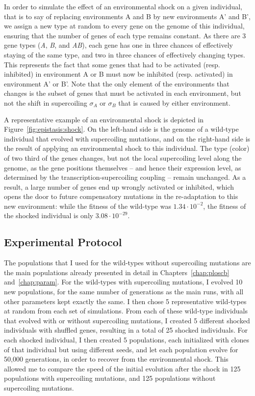 In order to simulate the effect of an environmental shock on a given individual, that is to say of replacing environments A and B by new environments A' and B', we assign a new type at random to every gene on the genome of this individual, ensuring that the number of genes of each type remains constant.
As there are 3 gene types (\emph{A}, \emph{B}, and \emph{AB}), each gene has one in three chances of effectively staying of the same type, and two in three chances of effectively changing types.
This represents the fact that some genes that had to be activated (resp. inhibited) in environment A or B must now be inhibited (resp. activated) in environment A' or B'.
Note that the only element of the environments that changes is the subset of genes that must be activated in each environment, but not the shift in supercoiling $\sigma_A$ or $\sigma_B$ that is caused by either environment.

A representative example of an environmental shock is depicted in Figure~\ref{fig:epistasis:shock}.
On the left-hand side is the genome of a wild-type individual that evolved with supercoiling mutations, and on the right-hand side is the result of applying an environmental shock to this individual.
The type (color) of two third of the genes changes, but not the local supercoiling level along the genome, as the gene positions themselves -- and hence their expression level, as determined by the transcription-supercoiling coupling -- remain unchanged.
As a result, a large number of genes end up wrongly activated or inhibited, which opens the door to future compensatory mutations in the re-adaptation to this new environment: while the fitness of the wild-type was $1.34\cdot10^{-2}$, the fitness of the shocked individual is only $3.08\cdot10^{-29}$.

\subsection{Experimental Protocol}

The populations that I used for the wild-types without supercoiling mutations are the main populations already presented in detail in Chapters~\ref{chap:ploscb} and~\ref{chap:param}.
For the wild-types with supercoiling mutations, I evolved 10 new populations, for the same number of generations as the main runs, with all other parameters kept exactly the same.
I then chose 5 representative wild-types at random from each set of simulations.
From each of these wild-type individuals that evolved with or without supercoiling mutations, I created 5 different shocked individuals with shuffled genes, resulting in a total of 25 shocked individuals.
For each shocked individual, I then created 5 populations, each initialized with clones of that individual but using different seeds, and let each population evolve for 50,000 generations, in order to recover from the environmental shock.
This allowed me to compare the speed of the initial evolution after the shock in 125 populations with supercoiling mutations, and 125 populations without supercoiling mutations.


